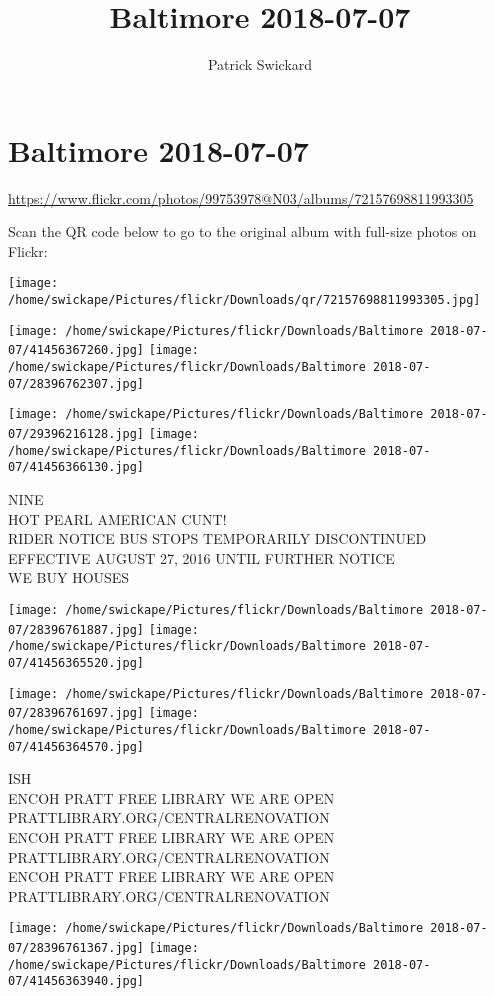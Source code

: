 \documentclass[10pt,letterpaper]{article}
\title{Baltimore 2018-07-07}
\author{Patrick Swickard}
\date{}
\begin{document}
\section*{Baltimore 2018-07-07}

\url{https://www.flickr.com/photos/99753978@N03/albums/72157698811993305}

Scan the QR code below to go to the original album with full-size photos on Flickr:

\texttt{[image: /home/swickape/Pictures/flickr/Downloads/qr/72157698811993305.jpg]}
\pagebreak

\texttt{[image: /home/swickape/Pictures/flickr/Downloads/Baltimore 2018-07-07/41456367260.jpg]}
\texttt{[image: /home/swickape/Pictures/flickr/Downloads/Baltimore 2018-07-07/28396762307.jpg]}

\texttt{[image: /home/swickape/Pictures/flickr/Downloads/Baltimore 2018-07-07/29396216128.jpg]}
\texttt{[image: /home/swickape/Pictures/flickr/Downloads/Baltimore 2018-07-07/41456366130.jpg]}

NINE\\
HOT PEARL AMERICAN CUNT!\\
RIDER NOTICE BUS STOPS TEMPORARILY DISCONTINUED EFFECTIVE AUGUST 27, 2016 UNTIL FURTHER NOTICE\\
WE BUY HOUSES
\pagebreak

\texttt{[image: /home/swickape/Pictures/flickr/Downloads/Baltimore 2018-07-07/28396761887.jpg]}
\texttt{[image: /home/swickape/Pictures/flickr/Downloads/Baltimore 2018-07-07/41456365520.jpg]}

\texttt{[image: /home/swickape/Pictures/flickr/Downloads/Baltimore 2018-07-07/28396761697.jpg]}
\texttt{[image: /home/swickape/Pictures/flickr/Downloads/Baltimore 2018-07-07/41456364570.jpg]}

ISH\\
ENCOH PRATT FREE LIBRARY WE ARE OPEN PRATTLIBRARY.ORG/CENTRALRENOVATION\\
ENCOH PRATT FREE LIBRARY WE ARE OPEN PRATTLIBRARY.ORG/CENTRALRENOVATION\\
ENCOH PRATT FREE LIBRARY WE ARE OPEN PRATTLIBRARY.ORG/CENTRALRENOVATION
\pagebreak

\texttt{[image: /home/swickape/Pictures/flickr/Downloads/Baltimore 2018-07-07/28396761367.jpg]}
\texttt{[image: /home/swickape/Pictures/flickr/Downloads/Baltimore 2018-07-07/41456363940.jpg]}
\end{document}
